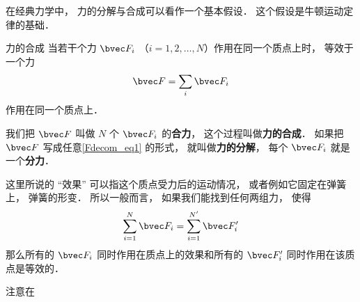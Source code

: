 

在经典力学中， 力的分解与合成可以看作一个基本假设． 这个假设是牛顿运动定律的基础．

\begin{theorem}{力的合成}
当若干个力 $\bvec F_i$ （$i = 1, 2, \dots, N$）作用在同一个质点上时， 等效于一个力
\begin{equation}\label{Fdecom_eq1}
\bvec F = \sum_i \bvec F_i
\end{equation}
作用在同一个质点上．
\end{theorem}
我们把 $\bvec F$ 叫做 $N$ 个 $\bvec F_i$ 的\textbf{合力}， 这个过程叫做\textbf{力的合成}． 如果把 $\bvec F$ 写成任意\autoref{Fdecom_eq1} 的形式， 就叫做\textbf{力的分解}， 每个 $\bvec F_i$ 就是一个\textbf{分力}．

这里所说的 “效果” 可以指这个质点受力后的运动情况， 或者例如它固定在弹簧上， 弹簧的形变． 所以一般而言， 如果我们能找到任何两组力， 使得
\begin{equation}
\sum_{i=1}^N \bvec F_i = \sum_{i=1}^{N'} \bvec F'_i
\end{equation}
那么所有的 $\bvec F_i$ 同时作用在质点上的效果和所有的 $\bvec F'_i$ 同时作用在该质点是等效的．

注意在